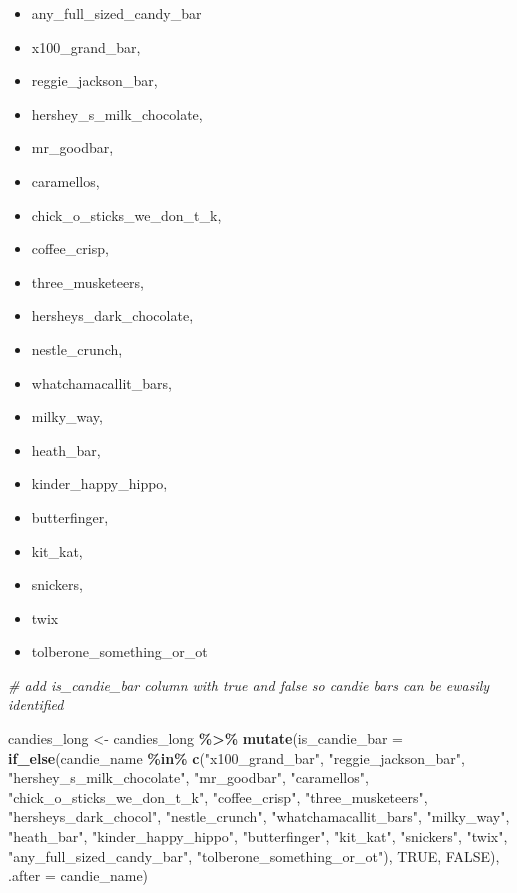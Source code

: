 \documentclass[
]{article}
\newenvironment{Shaded}{\begin{snugshade}}{\end{snugshade}}
\newcommand{\AttributeTok}[1]{\textcolor[rgb]{0.13,0.29,0.53}{#1}}
\newcommand{\CommentTok}[1]{\textcolor[rgb]{0.56,0.35,0.01}{\textit{#1}}}
\newcommand{\ConstantTok}[1]{\textcolor[rgb]{0.56,0.35,0.01}{#1}}
\newcommand{\FunctionTok}[1]{\textcolor[rgb]{0.13,0.29,0.53}{\textbf{#1}}}
\newcommand{\NormalTok}[1]{#1}
\newcommand{\OtherTok}[1]{\textcolor[rgb]{0.56,0.35,0.01}{#1}}
\newcommand{\SpecialCharTok}[1]{\textcolor[rgb]{0.81,0.36,0.00}{\textbf{#1}}}
\newcommand{\StringTok}[1]{\textcolor[rgb]{0.31,0.60,0.02}{#1}}
\begin{document}
\begin{itemize}
\item
  any\_full\_sized\_candy\_bar
\item
  x100\_grand\_bar,
\item
  reggie\_jackson\_bar,
\item
  hershey\_s\_milk\_chocolate,
\item
  mr\_goodbar,
\item
  caramellos,
\item
  chick\_o\_sticks\_we\_don\_t\_k,
\item
  coffee\_crisp,
\item
  three\_musketeers,
\item
  hersheys\_dark\_chocolate,
\item
  nestle\_crunch,
\item
  whatchamacallit\_bars,
\item
  milky\_way,
\item
  heath\_bar,
\item
  kinder\_happy\_hippo,
\item
  butterfinger,
\item
  kit\_kat,
\item
  snickers,
\item
  twix
\item
  tolberone\_something\_or\_ot
\end{itemize}

\begin{Shaded}
\begin{Highlighting}[]
\CommentTok{\# add \textquotesingle{}is\_candie\_bar\textquotesingle{} column with true and false so candie bars can be ewasily identified}

\NormalTok{candies\_long }\OtherTok{\textless{}{-}}\NormalTok{ candies\_long }\SpecialCharTok{\%\textgreater{}\%} 
  \FunctionTok{mutate}\NormalTok{(}\AttributeTok{is\_candie\_bar =} \FunctionTok{if\_else}\NormalTok{(candie\_name }\SpecialCharTok{\%in\%} \FunctionTok{c}\NormalTok{(}\StringTok{"x100\_grand\_bar"}\NormalTok{, }\StringTok{"reggie\_jackson\_bar"}\NormalTok{, }\StringTok{"hershey\_s\_milk\_chocolate"}\NormalTok{, }\StringTok{"mr\_goodbar"}\NormalTok{, }\StringTok{"caramellos"}\NormalTok{, }\StringTok{"chick\_o\_sticks\_we\_don\_t\_k"}\NormalTok{, }\StringTok{"coffee\_crisp"}\NormalTok{, }\StringTok{"three\_musketeers"}\NormalTok{, }\StringTok{"hersheys\_dark\_chocol"}\NormalTok{, }\StringTok{"nestle\_crunch"}\NormalTok{, }\StringTok{"whatchamacallit\_bars"}\NormalTok{, }\StringTok{"milky\_way"}\NormalTok{, }\StringTok{"heath\_bar"}\NormalTok{, }\StringTok{"kinder\_happy\_hippo"}\NormalTok{, }\StringTok{"butterfinger"}\NormalTok{, }\StringTok{"kit\_kat"}\NormalTok{, }\StringTok{"snickers"}\NormalTok{, }\StringTok{"twix"}\NormalTok{, }\StringTok{"any\_full\_sized\_candy\_bar"}\NormalTok{, }\StringTok{"tolberone\_something\_or\_ot"}\NormalTok{), }\ConstantTok{TRUE}\NormalTok{, }\ConstantTok{FALSE}\NormalTok{), }\AttributeTok{.after =}\NormalTok{ candie\_name)}
\end{Highlighting}
\end{Shaded}
\end{document}
